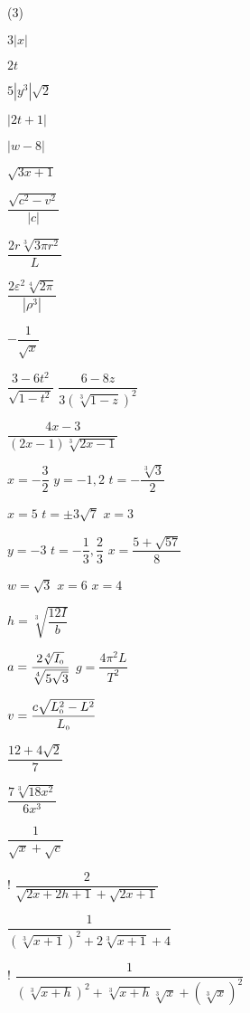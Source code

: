 \begin{tasks}(3)

\task   $3|x|$ 

\task   $2t$

\task   $5|y^3|\sqrt{2}$

\task  $|2t+1|$

\task  $|w-8|$

\task  $\sqrt{3x+1}$

\task $\dfrac{\sqrt{c^2-v^2}}{|c|}$ 

\task $\dfrac{2r \sqrt[3]{3 \pi r^2}}{L}$ 

\task  $\dfrac{2 \varepsilon^2 \sqrt[4]{2\pi}}{|\rho^3|}$ 


\task  $-\dfrac{1}{\sqrt{x}}$ 

\task  $\dfrac{3-6t^2}{\sqrt{1-t^2}}$
\task  $\dfrac{6-8z}{3 (\sqrt[3]{1-z})^2}$


\task  $\dfrac{4x-3}{(2x-1)\sqrt[3]{2x-1}}$  


\task  $x = -\dfrac{3}{2}$ 
\task $y = -1, 2$ 
\task  $t = -\dfrac{\sqrt[3]{3}}{2}$ 

\task $x = 5$
\task $t = \pm 3 \sqrt{7}$
\task $x=3$     


\task  $y=-3$ 
\task  $t = -\dfrac{1}{3}, \dfrac{2}{3}$ 
\task $x = \dfrac{5 + \sqrt{57}}{8}$

\task $w = \sqrt{3}$
\task $x = 6$
\task $x = 4$


\task $h = \sqrt[3]{\dfrac{12I}{b}}$ 

\task  $a = \dfrac{2 \sqrt[4]{I_{\text{\tiny $0$}}}}{\sqrt[4]{5\sqrt{3}}}$
\task $g = \dfrac{4 \pi^2 L}{T^2}$ 

\task $v = \dfrac{c \sqrt{L_{\text{\tiny $0$}}^2 - L^2}}{L_{\text{\tiny $0$}}}$  

\task   $\dfrac{12 + 4\sqrt{2}}{7}$  

\task  $\dfrac{7 \sqrt[3]{18x^2}}{6x^3}$

\task   $\dfrac{1}{\sqrt{x}+ \sqrt{c}}$ 

\task!  $\dfrac{2}{\sqrt{2x+2h+1} + \sqrt{2x+1}}$                                  

\task  $\dfrac{1}{(\sqrt[3]{x+1})^2 + 2\sqrt[3]{x+1} + 4}$                                    

\task!  $\dfrac{1}{(\sqrt[3]{x+h})^2 + \sqrt[3]{x+h}\sqrt[3]{x} + (\sqrt[3]{x})^2}$

\end{tasks}
